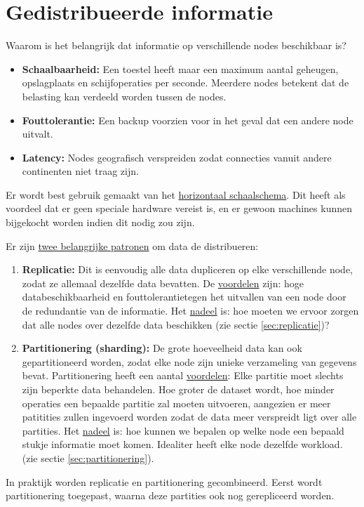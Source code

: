 	\chapter{Gedistribueerde informatie}
	Waarom is het belangrijk dat informatie op verschillende nodes beschikbaar is?
	\begin{itemize}
		\item \textbf{Schaalbaarheid:} Een toestel heeft maar een maximum aantal geheugen, opslagplaats en schijfoperaties per seconde. Meerdere nodes betekent dat de belasting kan verdeeld worden tussen de nodes.
		\item \textbf{Fouttolerantie:} Een backup voorzien voor in het geval dat een andere node uitvalt.
		\item \textbf{Latency:} Nodes geografisch verspreiden zodat connecties vanuit andere continenten niet traag zijn.
	\end{itemize}
	Er wordt best gebruik gemaakt van het \underline{horizontaal schaalschema}. Dit heeft als voordeel dat er geen speciale hardware vereist is, en er gewoon machines kunnen bijgekocht worden indien dit nodig zou zijn.

	Er zijn \underline{twee belangrijke patronen} om data de distribueren:
	\begin{enumerate}
		\item \textbf{Replicatie:} Dit is eenvoudig alle data dupliceren op elke verschillende node, zodat ze allemaal dezelfde data bevatten. De \underline{voordelen} zijn: hoge databeschikbaarheid en fouttolerantietegen het uitvallen van een node door de redundantie van de informatie. Het \underline{nadeel} is: hoe moeten we ervoor zorgen dat alle nodes over dezelfde data beschikken (zie sectie \ref{sec:replicatie})? 
		\item \textbf{Partitionering (sharding):} De grote hoeveelheid data kan ook gepartitioneerd worden, zodat elke node zijn unieke verzameling van gegevens bevat. Partitionering heeft een aantal \underline{voordelen}: Elke partitie moet slechts zijn beperkte data behandelen. Hoe groter de dataset wordt, hoe minder operaties een bepaalde partitie zal moeten uitvoeren, aangezien er meer patitities zullen ingevoerd worden zodat de data meer verspreidt ligt over alle partities. Het \underline{nadeel} is: hoe kunnen we bepalen op welke node een bepaald stukje informatie moet komen. Idealiter heeft elke node dezelfde workload. (zie sectie \ref{sec:partitionering}).
	\end{enumerate}
	In praktijk worden replicatie en partitionering gecombineerd. Eerst wordt partitionering toegepast, waarna deze partities ook nog gerepliceerd worden.

